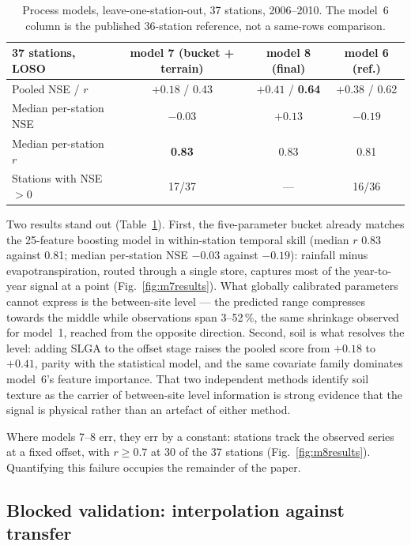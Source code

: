 \documentclass[11pt,a4paper]{article}
\begin{document}
\begin{table}[htbp]
\centering
\caption{Process models, leave-one-station-out, 37 stations, 2006--2010. The
model~6 column is the published 36-station reference, not a same-rows
comparison.}
\label{tab:proc-loso}
\small
\begin{tabular}{lccc}
\toprule
37 stations, LOSO & model 7 (bucket + terrain) & \textbf{model 8 (final)} & model 6 (ref.) \\
\midrule
Pooled NSE / $r$        & $+0.18$ / 0.43 & $\mathbf{+0.41}$ / \textbf{0.64} & $+0.38$ / 0.62 \\
Median per-station NSE  & $-0.03$        & $\mathbf{+0.13}$                 & $-0.19$ \\
Median per-station $r$  & \textbf{0.83}  & 0.83                             & 0.81 \\
Stations with NSE $> 0$ & 17/37          & ---                              & 16/36 \\
\bottomrule
\end{tabular}
\end{table}

Two results stand out (Table~\ref{tab:proc-loso}). First, the five-parameter
bucket already matches the 25-feature boosting model in within-station
temporal skill (median $r$ 0.83 against 0.81; median per-station NSE $-0.03$
against $-0.19$): rainfall minus evapotranspiration, routed through a single
store, captures most of the year-to-year signal at a point
(Fig.~\ref{fig:m7results}). What globally calibrated parameters cannot
express is the between-site level --- the predicted range compresses towards
the middle while observations span 3--52\,\%, the same shrinkage observed for
model~1, reached from the opposite direction. Second, soil is what resolves
the level: adding SLGA to the offset stage raises the pooled score from
$+0.18$ to $+0.41$, parity with the statistical model, and the same covariate
family dominates model~6's feature importance. That two independent methods
identify soil texture as the carrier of between-site level information is
strong evidence that the signal is physical rather than an artefact of either
method.

Where models 7--8 err, they err by a constant: stations track the observed
series at a fixed offset, with $r \geq 0.7$ at 30 of the 37 stations
(Fig.~\ref{fig:m8results}). Quantifying this failure occupies the remainder of
the paper.

\subsection{Blocked validation: interpolation against transfer}\label{sec:blocked}
\end{document}
